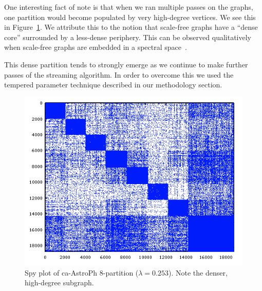 One interesting fact of note is that when we ran multiple passes on the graphs, one partition would become populated by very high-degree vertices.
We see this in Figure~\ref{fig:dense}. 
We attribute this to the notion that scale-free graphs have a ``dense core'' surrounded by a less-dense periphery.
This can be observed qualitatively when scale-free graphs are embedded in a spectral space~\cite{Lang04findinggood}.

This dense partition tends to strongly emerge as we continue to make further passes of the streaming algorithm.
In order to overcome this we used the tempered parameter technique described in our methodology section. 

\begin{figure}[h!]
\centering
  \includegraphics[width=0.8\columnwidth]{figures/astroPh8.png}
  \caption{Spy plot of ca-AstroPh 8-partition ($\lambda=0.253$). Note the denser, high-degree subgraph.}
  \label{fig:dense}
\end{figure}


